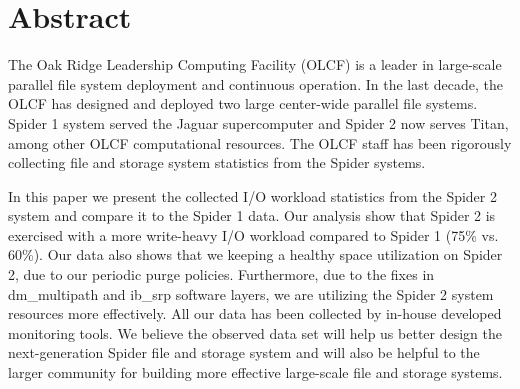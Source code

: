 \section*{Abstract}
\label{sec:abstract}

The Oak Ridge Leadership Computing Facility (OLCF) is a leader in large-scale
parallel file system deployment and continuous operation. In the last decade,
the OLCF has designed and deployed two large center-wide parallel file systems.
Spider 1 system served the Jaguar supercomputer and Spider 2 now serves Titan,
among other OLCF computational resources. The OLCF staff has been rigorously
collecting file and storage system statistics from the Spider systems. 

In this paper we present the collected I/O workload statistics from the Spider
2 system and compare it to the Spider 1 data. Our analysis show that Spider 2
is exercised with a more write-heavy I/O workload compared to Spider 1 (75\%
vs. 60\%). Our data also shows that we keeping a healthy space utilization on
Spider 2, due to our periodic purge policies. Furthermore, due to the fixes in
dm\_multipath and ib\_srp software layers, we are utilizing the Spider 2 system
resources more effectively. All our data has been collected by in-house
developed monitoring tools. We believe the observed data set will help us
better design the next-generation Spider file and storage system and will also
be helpful to the larger community for building more effective large-scale file
and storage systems. 

 
